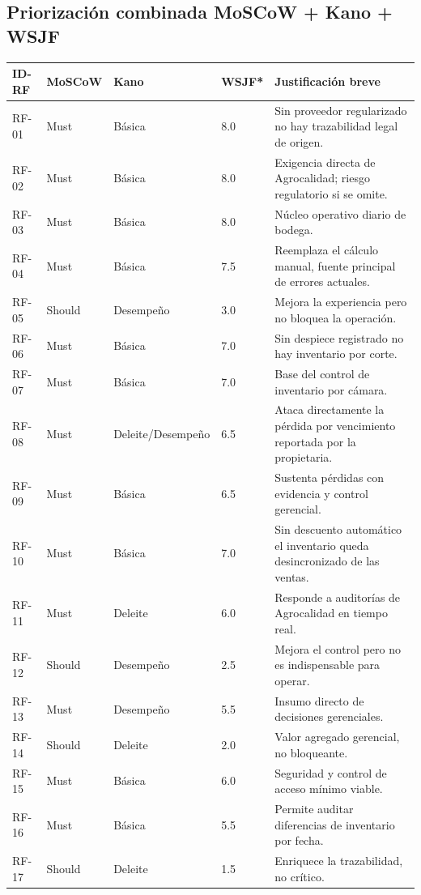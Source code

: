 \documentclass[11pt,a4paper]{article}
\begin{document}
\subsection{Priorización combinada MoSCoW + Kano + WSJF}
\begin{longtable}{|p{1.3cm}|p{1.5cm}|p{2.2cm}|p{1.6cm}|p{7.5cm}|}
\hline
\textbf{ID-RF} & \textbf{MoSCoW} & \textbf{Kano} & \textbf{WSJF*} & \textbf{Justificación breve} \\
\hline
RF-01 & Must & Básica & 8.0 & Sin proveedor regularizado no hay trazabilidad legal de origen. \\
RF-02 & Must & Básica & 8.0 & Exigencia directa de Agrocalidad; riesgo regulatorio si se omite. \\
RF-03 & Must & Básica & 8.0 & Núcleo operativo diario de bodega. \\
RF-04 & Must & Básica & 7.5 & Reemplaza el cálculo manual, fuente principal de errores actuales. \\
RF-05 & Should & Desempeño & 3.0 & Mejora la experiencia pero no bloquea la operación. \\
RF-06 & Must & Básica & 7.0 & Sin despiece registrado no hay inventario por corte. \\
RF-07 & Must & Básica & 7.0 & Base del control de inventario por cámara. \\
RF-08 & Must & Deleite/Desempeño & 6.5 & Ataca directamente la pérdida por vencimiento reportada por la propietaria. \\
RF-09 & Must & Básica & 6.5 & Sustenta pérdidas con evidencia y control gerencial. \\
RF-10 & Must & Básica & 7.0 & Sin descuento automático el inventario queda desincronizado de las ventas. \\
RF-11 & Must & Deleite & 6.0 & Responde a auditorías de Agrocalidad en tiempo real. \\
RF-12 & Should & Desempeño & 2.5 & Mejora el control pero no es indispensable para operar. \\
RF-13 & Must & Desempeño & 5.5 & Insumo directo de decisiones gerenciales. \\
RF-14 & Should & Deleite & 2.0 & Valor agregado gerencial, no bloqueante. \\
RF-15 & Must & Básica & 6.0 & Seguridad y control de acceso mínimo viable. \\
RF-16 & Must & Básica & 5.5 & Permite auditar diferencias de inventario por fecha. \\
RF-17 & Should & Deleite & 1.5 & Enriquece la trazabilidad, no crítico. \\

\end{longtable}
\end{document}
